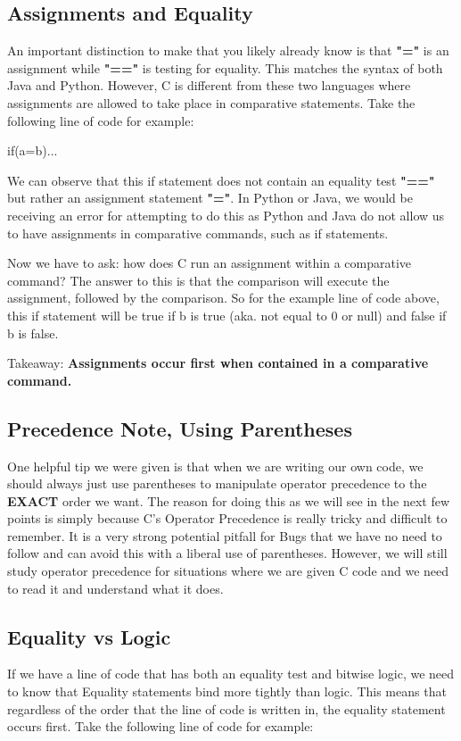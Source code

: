 \documentclass[letterpaper]{article}
\theoremstyle{remark}
\begin{document}
\subsection{Assignments and Equality}
An important distinction to make that you likely already know is that \textbf{"="} is an assignment while \textbf{"=="} is testing for equality. This matches the syntax of both Java and Python. However, C is different from these two languages where assignments are allowed to take place in comparative statements. Take the following line of code for example:

\huge{if(a=b)...}

\normalsize{We can observe that this if statement does not contain an equality test \textbf{"=="} but rather an assignment statement \textbf{"="}. In Python or Java, we would be receiving an error for attempting to do this as Python and Java do not allow us to have assignments in comparative commands, such as if statements.}

Now we have to ask: how does C run an assignment within a comparative command? The answer to this is that the comparison will execute the assignment, followed by the comparison. So for the example line of code above, this if statement will be true if b is true (aka. not equal to 0 or null) and false if b is false.

Takeaway: \textbf{Assignments occur first when contained in a comparative command.}

\subsection{Precedence Note, Using Parentheses}
One helpful tip we were given is that when we are writing our own code, we should always just use parentheses to manipulate operator precedence to the \textbf{EXACT} order we want. The reason for doing this as we will see in the next few points is simply because C's Operator Precedence is really tricky and difficult to remember. It is a very strong potential pitfall for Bugs that we have no need to follow and can avoid this with a liberal use of parentheses. However, we will still study operator precedence for situations where we are given C code and we need to read it and understand what it does.

\subsection{Equality vs Logic}
If we have a line of code that has both an equality test and bitwise logic, we need to know that Equality statements bind more tightly than logic. This means that regardless of the order that the line of code is written in, the equality statement occurs first. Take the following line of code for example:
\end{document}
